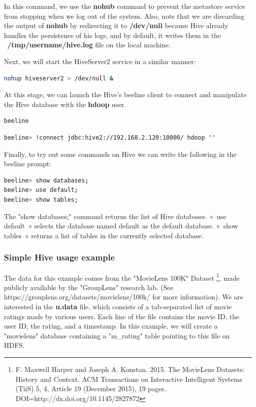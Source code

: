 \documentclass[12pt,english]{book}
\begin{document}
In this command, we use the \textbf{nohub} command to prevent the metastore service from stopping when we log out of the system.
Also, note that we are discarding the output of \textbf{nohub} by redirecting it to \textbf{/dev/null} because Hive already handles the persistence of his logs, and by default, it writes them in the \
\textbf{/tmp/{username}/hive.log} file on the local machine.

Next, we will start the HiveServer2 service in a similar manner:

\begin{lstlisting}[language=bash, frame=single, basicstyle=\footnotesize]
nohup hiveserver2 > /dev/null &
\end{lstlisting}


At this stage, we can launch the Hive's beeline client to connect and manipulate the Hive database with the \textbf{hdoop} user.

\begin{lstlisting}[language=bash, frame=single, basicstyle=\footnotesize]
beeline
\end{lstlisting}

\begin{lstlisting}[language=bash, frame=single, basicstyle=\footnotesize]
beeline> !connect jdbc:hive2://192.168.2.120:10000/ hdoop ""
\end{lstlisting}

Finally, to try out some commands on Hive we can write the following in the beeline prompt:

\begin{lstlisting}[language=bash, frame=single, basicstyle=\footnotesize]
beeline> show databases;
beeline> use default;
beeline> show tables;
\end{lstlisting}

The "show databases;" command returns the list of Hive databases.
« use default » selects the database named default as the default database.
« show tables » returns a list of tables in the currently selected database.

\subsubsection{Simple Hive usage example}

The data for this example comes from the "MovieLens 100K" Dataset
\footnote{
F. Maxwell Harper and Joseph A. Konstan. 2015. The MovieLens Datasets:
History and Context. ACM Transactions on Interactive Intelligent
Systems (TiiS) 5, 4, Article 19 (December 2015), 19 pages.
DOI=http://dx.doi.org/10.1145/2827872},
made publicly available by the "GroupLens" research lab.
(See https://grouplens.org/datasets/movielens/100k/ for more information).
We are interested in the \textbf{u.data} file, which consists of a tab-separated list of movie ratings made by various users.
Each line of the file contains the movie ID, the user ID, the rating, and a timestamp.
In this example, we will create a "movielens" database containing a "m\_rating" table pointing to this file on HDFS.
\end{document}
